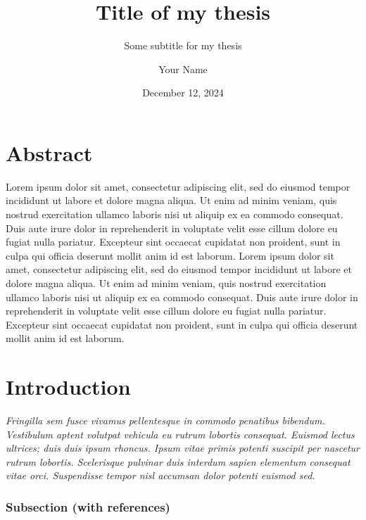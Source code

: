 \documentclass[
  a4paper,
]{scrbook}
\title{Title of my thesis}
\subtitle{Some subtitle for my thesis}
\author{Your Name}
\date{December 12, 2024}
\renewcommand*\contentsname{Table of contents}
\newcommand\contentsname{Table of contents}
\begin{document}
\frontmatter
\maketitle

\renewcommand*\contentsname{Table of contents}
{
\setcounter{tocdepth}{1}
\tableofcontents
}

\mainmatter
\chapter{Abstract}\label{abstract}

Lorem ipsum dolor sit amet, consectetur adipiscing elit, sed do eiusmod
tempor incididunt ut labore et dolore magna aliqua. Ut enim ad minim
veniam, quis nostrud exercitation ullamco laboris nisi ut aliquip ex ea
commodo consequat. Duis aute irure dolor in reprehenderit in voluptate
velit esse cillum dolore eu fugiat nulla pariatur. Excepteur sint
occaecat cupidatat non proident, sunt in culpa qui officia deserunt
mollit anim id est laborum. Lorem ipsum dolor sit amet, consectetur
adipiscing elit, sed do eiusmod tempor incididunt ut labore et dolore
magna aliqua. Ut enim ad minim veniam, quis nostrud exercitation ullamco
laboris nisi ut aliquip ex ea commodo consequat. Duis aute irure dolor
in reprehenderit in voluptate velit esse cillum dolore eu fugiat nulla
pariatur. Excepteur sint occaecat cupidatat non proident, sunt in culpa
qui officia deserunt mollit anim id est laborum.

\chapter{Introduction}\label{introduction}

\emph{Fringilla sem fusce vivamus pellentesque in commodo penatibus
bibendum. Vestibulum aptent volutpat vehicula eu rutrum lobortis
consequat. Euismod lectus ultrices; duis duis ipsum rhoncus. Ipsum vitae
primis potenti suscipit per nascetur rutrum lobortis. Scelerisque
pulvinar duis interdum sapien elementum consequat vitae orci.
Suspendisse tempor nisl accumsan dolor potenti euismod sed.}

\subsection{Subsection (with
references)}\label{subsection-with-references}
\end{document}

